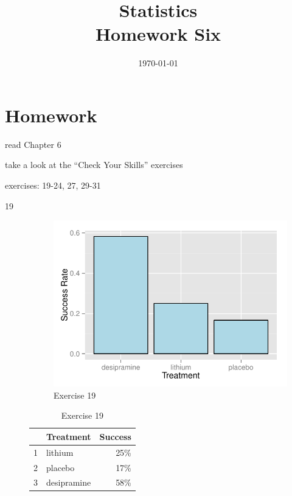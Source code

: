 \documentclass[letterpaper, landscape]{exam}
\title{Statistics \\ Homework Six}
\date{\today}
\author{}
\begin{document}
  \maketitle

  \section{Homework}
    \begin{itemize*}
      \item read Chapter 6 
      \item take a look at the ``Check Your Skills'' exercises
      \item exercises: 19-24, 27, 29-31
    \end{itemize*}

  \ifprintanswers
    \begin{description}

      \item[19]     
        \begin{figure}[H]
          \centering
          \includegraphics[scale = 0.8]{figures/ex19.pdf}
          \caption{Exercise 19}
          \label{fig:ex19}
        \end{figure}

        \begin{table}[H]
          \centering
          \begin{tabular}{rlr}
            \toprule
              & Treatment   & Success \\
            \midrule
            1 & lithium     & 25\% \\
            2 & placebo     & 17\% \\
            3 & desipramine & 58\% \\
            \bottomrule
          \end{tabular}
          \caption{Exercise 19}
          \label{tab:ex19}
        \end{table}


\end{description}
\end{document}
